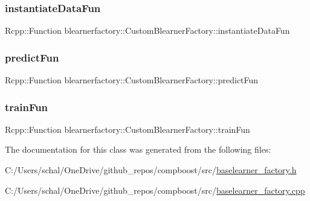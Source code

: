 \subsubsection{\texorpdfstring{instantiate\+Data\+Fun}{instantiateDataFun}}
{\footnotesize\ttfamily Rcpp\+::\+Function blearnerfactory\+::\+Custom\+Blearner\+Factory\+::instantiate\+Data\+Fun\hspace{0.3cm}{\ttfamily [private]}}

\mbox{\label{classblearnerfactory_1_1_custom_blearner_factory_a6cf80331e6ce5d8cabb25d7af09f9eea}} 
\subsubsection{\texorpdfstring{predict\+Fun}{predictFun}}
{\footnotesize\ttfamily Rcpp\+::\+Function blearnerfactory\+::\+Custom\+Blearner\+Factory\+::predict\+Fun\hspace{0.3cm}{\ttfamily [private]}}

\mbox{\label{classblearnerfactory_1_1_custom_blearner_factory_ac342da04b06c4e707811e4b312ce6c61}} 
\subsubsection{\texorpdfstring{train\+Fun}{trainFun}}
{\footnotesize\ttfamily Rcpp\+::\+Function blearnerfactory\+::\+Custom\+Blearner\+Factory\+::train\+Fun\hspace{0.3cm}{\ttfamily [private]}}



The documentation for this class was generated from the following files\+:\begin{DoxyCompactItemize}
\item 
C\+:/\+Users/schal/\+One\+Drive/github\+\_\+repos/compboost/src/\mbox{\hyperlink{baselearner__factory_8h}{baselearner\+\_\+factory.\+h}}\item 
C\+:/\+Users/schal/\+One\+Drive/github\+\_\+repos/compboost/src/\mbox{\hyperlink{baselearner__factory_8cpp}{baselearner\+\_\+factory.\+cpp}}\end{DoxyCompactItemize}
